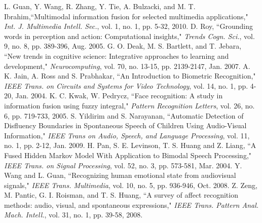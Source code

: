 \documentclass[journal]{IEEEtran}
\begin{document}
%
%
%
\begin{thebibliography}{1}


L. Guan, Y. Wang, R. Zhang, Y. Tie, A. Bulzacki, and M. T. Ibrahim,``Multimodal information fusion for selected multimedia applications," \emph{Int. J. Multimedia Intell. Sec.}, vol. 1, no. 1, pp. 5-32, 2010.
D. Roy, ``Grounding words in perception and action: Computational insights," \emph{Trends Cogn. Sci.}, vol. 9, no. 8, pp. 389-396, Aug. 2005.
G. O. Deak, M. S. Bartlett, and T. Jebara, ``New trends in cognitive science: Integrative approaches to learning and development," \emph{Neurocomputing}, vol. 70, no. 13-15, pp. 2139-2147, Jan. 2007.
A. K. Jain, A. Ross and S. Prabhakar, ``An Introduction to Biometric Recognition," \emph{IEEE Trans. on Circuits and Systems for Video Technology}, vol. 14, no. 1, pp. 4-20, Jan. 2004.
K. C. Kwak, W. Pedrycz, ``Face recognition: A study in information fusion using fuzzy integral," \emph{Pattern Recognition Letters}, vol. 26, no. 6, pp. 719-733, 2005.
S. Yildirim and S. Narayanan, ``Automatic Detection of Disfluency Boundaries in Spontaneous Speech of Children Using Audio-Visual Information," \emph{IEEE Trans on Audio, Speech, and Language Processing}, vol. 11, no. 1, pp. 2-12, Jan. 2009.
H. Pan, S. E. Levinson, T. S. Huang and Z. Liang, ``A Fused Hidden Markov Model With Application to Bimodal Speech Processing,"  \emph{IEEE Trans. on  Signal Processing}, vol. 52, no. 3, pp. 573-581, Mar. 2004.
Y. Wang and L. Guan, ``Recognizing human emotional state from audiovisual signals," \emph{IEEE Trans. Multimedia}, vol. 10, no. 5, pp. 936-946, Oct. 2008.
Z. Zeng, M. Pantic, G. I. Roisman, and T. S. Huang, ``A survey of affect recognition methods: audio, visual, and spontaneous expressions," \emph{IEEE Trans. Pattern Anal. Mach. Intell.}, vol. 31, no. 1, pp. 39-58, 2008.

\end{thebibliography}
\end{document}
